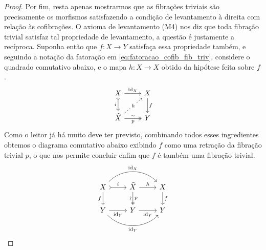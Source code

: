 \begin{proof}
  Por fim, resta apenas mostrarmos que as fibrações triviais são precisamente os morfismos satisfazendo a condição de levantamento à direita com relação às cofibrações.
  O axioma de levantamento (M4) nos diz que toda fibração trivial satisfaz tal propriedade de levantamento, a questão é justamente a recíproca.
  Suponha então que $f: X \to Y$ satisfaça essa propriedade também, e seguindo a notação da fatoração em \eqref{eq:fatoracao_cofib_fib_triv}, considere o quadrado comutativo abaixo, e o mapa $h: \widehat{X} \to X$ obtido da hipótese feita sobre $f$.
  \begin{displaymath}
    \begin{tikzcd}
      X
      \arrow[r, "\id_{X}"]
      \arrow[d, tail, "i" swap]
      & X
      \arrow[d, "f"]
      \\ \widehat{X}
      \arrow[r, two heads, "p" {swap}, "\sim"]
      \arrow[ru, dashed, "h" description]
      & Y
    \end{tikzcd}
  \end{displaymath}
  Como o leitor já há muito deve ter previsto, combinando todos esses ingredientes obtemos o diagrama comutativo abaixo exibindo $f$ como uma retração da fibração trivial $p$, o que nos permite concluir enfim que $f$ é também uma fibração trivial.
  \begin{displaymath}
    \begin{tikzcd}
      X
      \arrow[r, tail, "i"]
      \arrow[d, "f" swap]
      \arrow[rr, bend left=45, "\id_{X}"]
      & \widehat{X}
      \arrow[r, "h"]
      \arrow[d, two heads, "p", "\sim" {swap,sloped}]
      & X
      \arrow[d, "f"]
      \\ Y
      \arrow[r, "\id_{Y}" swap]
      \arrow[rr, bend right=45, "\id_{Y}" swap]
      & Y
      \arrow[r, "\id_{Y}" swap]
      & Y
    \end{tikzcd} \qedhere
  \end{displaymath}
\end{proof}



